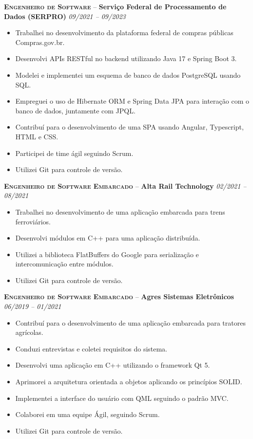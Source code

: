 \documentclass[a4paper,12pt]{article}
\begin{document}
\textbf{\textsc{Engenheiro de Software}} -- \textbf{Serviço Federal de Processamento de Dados (SERPRO)} \hfill \textit{09/2021 -- 09/2023}

{\small
\begin{itemize}[leftmargin=*,label=\large\textbullet]
    \setlength\itemsep{-0.2em}
    \item Trabalhei no desenvolvimento da plataforma federal de compras públicas Compras.gov.br.
    \item Desenvolvi APIs RESTful no backend utilizando Java 17 e Spring Boot 3.
    \item Modelei e implementei um esquema de banco de dados PostgreSQL usando SQL.
    \item Empreguei o uso de Hibernate ORM e Spring Data JPA para interação com o banco de dados, juntamente com JPQL.
    \item Contribuí para o desenvolvimento de uma SPA usando Angular, Typescript, HTML e CSS.
    \item Participei de time ágil seguindo Scrum.
    \item Utilizei Git para controle de versão.
\end{itemize}
}

\textbf{\textsc{Engenheiro de Software Embarcado}} -- \textbf{Alta Rail Technology} \hfill \textit{02/2021 -- 08/2021}

{\small
\begin{itemize}[leftmargin=*,label=\large\textbullet]
    \setlength\itemsep{-0.2em}
    \item Trabalhei no desenvolvimento de uma aplicação embarcada para trens ferroviários.
    \item Desenvolvi módulos em C++ para uma aplicação distribuída.
    \item Utilizei a biblioteca FlatBuffers do Google para serialização e intercomunicação entre módulos.
    \item Utilizei Git para controle de versão.
\end{itemize}
}

\textbf{\textsc{Engenheiro de Software Embarcado}} -- \textbf{Agres Sistemas Eletrônicos} \hfill \textit{06/2019 -- 01/2021}

{\small
\begin{itemize}[leftmargin=*,label=\large\textbullet]
    \setlength\itemsep{-0.2em}
    \item Contribuí para o desenvolvimento de uma aplicação embarcada para tratores agrícolas.
    \item Conduzi entrevistas e coletei requisitos do sistema.
    \item Desenvolvi uma aplicação em C++ utilizando o framework Qt 5.
    \item Aprimorei a arquitetura orientada a objetos aplicando os princípios SOLID.
    \item Implementei a interface do usuário com QML seguindo o padrão MVC.
    \item Colaborei em uma equipe Ágil, seguindo Scrum.
    \item Utilizei Git para controle de versão.
\end{itemize}
}
\end{document}
